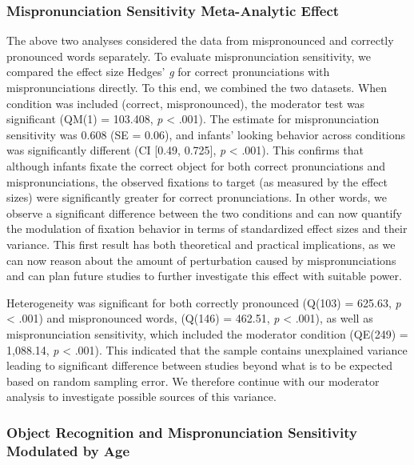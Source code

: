 \documentclass[man]{apa6}
\begin{document}
\hypertarget{mispronunciation-sensitivity-meta-analytic-effect}{%
\subsubsection{Mispronunciation Sensitivity Meta-Analytic Effect}\label{mispronunciation-sensitivity-meta-analytic-effect}}

The above two analyses considered the data from mispronounced and correctly pronounced words separately. To evaluate mispronunciation sensitivity, we compared the effect size Hedges' \emph{g} for correct pronunciations with mispronunciations directly. To this end, we combined the two datasets. When condition was included (correct, mispronounced), the moderator test was significant (QM(1) = 103.408, \emph{p} \textless{} .001). The estimate for mispronunciation sensitivity was 0.608 (SE = 0.06), and infants' looking behavior across conditions was significantly different (CI {[}0.49, 0.725{]}, \emph{p} \textless{} .001). This confirms that although infants fixate the correct object for both correct pronunciations and mispronunciations, the observed fixations to target (as measured by the effect sizes) were significantly greater for correct pronunciations. In other words, we observe a significant difference between the two conditions and can now quantify the modulation of fixation behavior in terms of standardized effect sizes and their variance. This first result has both theoretical and practical implications, as we can now reason about the amount of perturbation caused by mispronunciations and can plan future studies to further investigate this effect with suitable power.

Heterogeneity was significant for both correctly pronounced (Q(103) = 625.63, \emph{p} \textless{} .001) and mispronounced words, (Q(146) = 462.51, \emph{p} \textless{} .001), as well as mispronunciation sensitivity, which included the moderator condition (QE(249) = 1,088.14, \emph{p} \textless{} .001). This indicated that the sample contains unexplained variance leading to significant difference between studies beyond what is to be expected based on random sampling error. We therefore continue with our moderator analysis to investigate possible sources of this variance.

\hypertarget{object-recognition-and-mispronunciation-sensitivity-modulated-by-age}{%
\subsubsection{Object Recognition and Mispronunciation Sensitivity Modulated by Age}\label{object-recognition-and-mispronunciation-sensitivity-modulated-by-age}}
\end{document}
